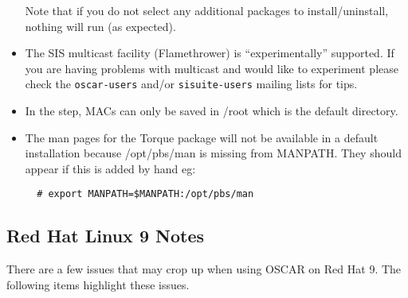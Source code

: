 \begin{itemize}
  Note that if you do not select any additional packages to
  install/uninstall, nothing will run (as expected).

\item The SIS multicast facility (Flamethrower) is ``experimentally''
  supported.  If you are having problems with multicast and would like
  to experiment please check the {\tt oscar-users} and/or
  {\tt sisuite-users} mailing lists for tips.

\begchange
\item In the  step, MACs can
  only be saved in /root which is the default directory.

\item The man pages for the Torque package will not be available in
  a default installation because /opt/pbs/man is missing from
  MANPATH.  They should appear if this is added by hand eg:

\begin{verbatim}
  # export MANPATH=$MANPATH:/opt/pbs/man
\end{verbatim}
\endchange


\end{itemize}


\subsection{Red Hat Linux 9 Notes}
\label{subsec:rh90notes}

There are a few issues that may crop up when using OSCAR on Red Hat 9.
The following items highlight these issues.

